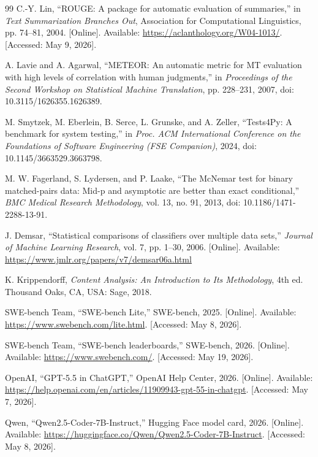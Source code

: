 \documentclass[preprint,12pt]{elsarticle}
\begin{document}
\begin{thebibliography}{99}
 C.-Y. Lin, ``ROUGE: A package for automatic evaluation of summaries,'' in \textit{Text Summarization Branches Out}, Association for Computational Linguistics, pp. 74--81, 2004. [Online]. Available: \url{https://aclanthology.org/W04-1013/}. [Accessed: May 9, 2026].

 A. Lavie and A. Agarwal, ``METEOR: An automatic metric for MT evaluation with high levels of correlation with human judgments,'' in \textit{Proceedings of the Second Workshop on Statistical Machine Translation}, pp. 228--231, 2007, doi: 10.3115/1626355.1626389.

 M. Smytzek, M. Eberlein, B. Serce, L. Grunske, and A. Zeller, ``Tests4Py: A benchmark for system testing,'' in \textit{Proc. ACM International Conference on the Foundations of Software Engineering (FSE Companion)}, 2024, doi: 10.1145/3663529.3663798.

 M. W. Fagerland, S. Lydersen, and P. Laake, ``The McNemar test for binary matched-pairs data: Mid-p and asymptotic are better than exact conditional,'' \textit{BMC Medical Research Methodology}, vol. 13, no. 91, 2013, doi: 10.1186/1471-2288-13-91.

 J. Demsar, ``Statistical comparisons of classifiers over multiple data sets,'' \textit{Journal of Machine Learning Research}, vol. 7, pp. 1--30, 2006. [Online]. Available: \url{https://www.jmlr.org/papers/v7/demsar06a.html}

 K. Krippendorff, \textit{Content Analysis: An Introduction to Its Methodology}, 4th ed. Thousand Oaks, CA, USA: Sage, 2018.

 SWE-bench Team, ``SWE-bench Lite,'' SWE-bench, 2025. [Online]. Available: \url{https://www.swebench.com/lite.html}. [Accessed: May 8, 2026].

 SWE-bench Team, ``SWE-bench leaderboards,'' SWE-bench, 2026. [Online]. Available: \url{https://www.swebench.com/}. [Accessed: May 19, 2026].


 OpenAI, ``GPT-5.5 in ChatGPT,'' OpenAI Help Center, 2026. [Online]. Available: \url{https://help.openai.com/en/articles/11909943-gpt-55-in-chatgpt}. [Accessed: May 7, 2026].


 Qwen, ``Qwen2.5-Coder-7B-Instruct,'' Hugging Face model card, 2026. [Online]. Available: \url{https://huggingface.co/Qwen/Qwen2.5-Coder-7B-Instruct}. [Accessed: May 8, 2026].


\end{thebibliography}
\end{document}
